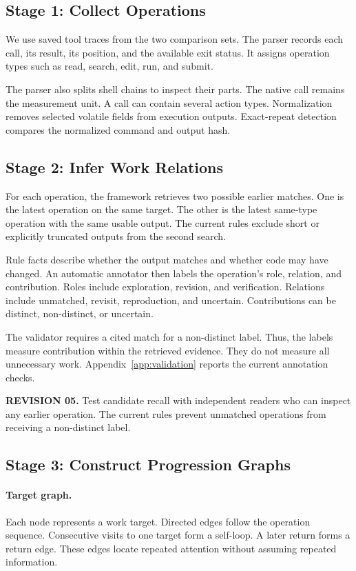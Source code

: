 \documentclass[10pt,a4paper,twocolumn]{article}
\newcommand{\rev}[2]{\par\smallskip\noindent\begin{minipage}{\linewidth}\color{revision}\footnotesize\textbf{REVISION #1.} #2\end{minipage}\par\smallskip}
\begin{document}
\subsection{Stage 1: Collect Operations}
We use saved tool traces from the two comparison sets. The parser records each call, its result, its position, and the available exit status. It assigns operation types such as read, search, edit, run, and submit.

The parser also splits shell chains to inspect their parts. The native call remains the measurement unit. A call can contain several action types. Normalization removes selected volatile fields from execution outputs. Exact-repeat detection compares the normalized command and output hash.

\subsection{Stage 2: Infer Work Relations}
For each operation, the framework retrieves two possible earlier matches. One is the latest operation on the same target. The other is the latest same-type operation with the same usable output. The current rules exclude short or explicitly truncated outputs from the second search.

Rule facts describe whether the output matches and whether code may have changed. An automatic annotator then labels the operation's role, relation, and contribution. Roles include exploration, revision, and verification. Relations include unmatched, revisit, reproduction, and uncertain. Contributions can be distinct, non-distinct, or uncertain.

The validator requires a cited match for a non-distinct label. Thus, the labels measure contribution within the retrieved evidence. They do not measure all unnecessary work. Appendix~\ref{app:validation} reports the current annotation checks.
\rev{05}{Test candidate recall with independent readers who can inspect any earlier operation. The current rules prevent unmatched operations from receiving a non-distinct label.}

\subsection{Stage 3: Construct Progression Graphs}
\paragraph{Target graph.}
Each node represents a work target. Directed edges follow the operation sequence. Consecutive visits to one target form a self-loop. A later return forms a return edge. These edges locate repeated attention without assuming repeated information.
\end{document}
